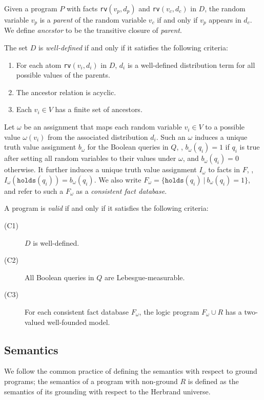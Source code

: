 Given a program $P$ with facts \verb|rv|$(v_p,d_p)$ and \verb|rv|$(v_c,d_c)$ in $D$, the random variable $v_p$  is a \emph{parent} of the random variable $v_c$ if and only if  $v_p$ appears in $d_c$. We define \emph{ancestor} to be the transitive closure of \emph{parent}.

\begin{definition}\label{def:well-defd-facts}
The set $D$ is \emph{well-defined} if and only if it satisfies the following criteria:
\begin{enumerate}
\item For each atom \verb|rv|$(v_i,d_i)$ in $D$, $d_i$ is a well-defined distribution term for all possible values of the parents. 
\item The ancestor relation is acyclic.
\item Each $v_i\in V$ has a finite set of ancestors.
\end{enumerate}  
\end{definition}

Let $\omega$ be an assignment that maps each random variable $v_i \in V$ to a possible value $\omega(v_i)$ from the associated distribution $d_i$. 
Such an $\omega$ induces a unique truth value assignment $b_{\omega}$ for the Boolean queries in $Q$, \ie, $b_{\omega}(q_i)=1$ if $q_i$ is true after setting all random variables to their values under $\omega$, and $b_{\omega}(q_i)=0$ otherwise. 
It further induces a unique truth value assignment $I_{\omega}$ to facts in $F$, \ie, $I_{\omega}(\mathtt{holds}(q_i))=b_{\omega}(q_i)$. We also write $F_{\omega}=\{\mathtt{holds}(q_i)~|~b_{\omega}(q_i)=1\}$, and refer to such a $F_{\omega}$ as a \emph{consistent fact database}. 



A program is \emph{valid} if and only if it satisfies the following criteria:
\begin{description}
\item[(C1)] $D$ is well-defined. 
\item[(C2)] All Boolean queries in $Q$ are Lebesgue-measurable.
\item[(C3)] For each consistent fact database $F_{\omega}$, the logic program $F_{\omega}\cup R$ has a two-valued well-founded model.  
\end{description}

\subsection{Semantics}
We follow the common practice of defining the semantics with respect to ground programs; the semantics of a program with non-ground $R$ is defined as the semantics of its grounding with respect to the  Herbrand universe.

